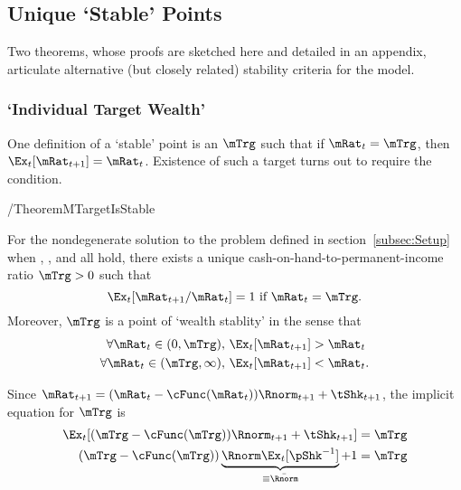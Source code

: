\documentclass[BufferStockTheory]{subfiles}
\providecommand{\LtxDir}{LaTeX/}
\begin{document}
\subsection{Unique `Stable' Points}

Two theorems, whose proofs are sketched here and detailed in an appendix, articulate alternative (but closely related) stability criteria for the model.

\label{subsec:onetarget}
\hypertarget{TheoremTarget}{}


\subsubsection{`Individual Target Wealth'} \label{subsubsec:mTarget}
One definition of a `stable' point is an $\mTrg$ such that if $\mRat_{t}=\mTrg$, then $\Ex_{t}[\mRat_{t+1}]=\mRat_{t}$.  Existence of such a target turns out to require the {\GICNrm} condition.

\begin{verbatimwrite}{\EqDir/TheoremMTargetIsStable}
\begin{theorem}\label{thm:target}
  For the nondegenerate solution to the problem defined in section~\ref{subsec:Setup} when {\FVAC}, {\WRIC}, and {\GICNrm} all hold, there exists a unique cash-on-hand-to-permanent-income ratio $\mTrg>0$ such that
  \begin{equation}  
    \Ex_t [{\mRat}_{t+1}/\mRat_t] = 1 \mbox{~if~} \mRat_t = \mTrg. 
    \label{eq:mTarget}
  \end{equation}
  Moreover, $\mTrg$ is a point of `wealth stablity' in the sense that
  \begin{align}\label{eq:stability}
    \forall {\mRat}_t\in(0,\mTrg),      \,\,& \Ex_t [{\mRat}_{t+1}] > {\mRat}_t  \\
    \forall {\mRat}_t\in(\mTrg,\infty), \,\,& \Ex_t [{\mRat}_{t+1}] < {\mRat}_t. \notag
  \end{align}
  \end{theorem}
\end{verbatimwrite}


 \hypertarget{mTargImplicit}{}
 
 Since $\mRat_{t+1}=(\mRat_{t}-\cFunc(\mRat_{t}))\Rnorm_{t+1}+\tShk_{t+1}$, the implicit equation for $\mTrg$ is
 \begin{align}
  \Ex_{t}[(\mTrg-\cFunc(\mTrg))\Rnorm_{t+1}+\tShk_{t+1}] & = \mTrg \label{eq:mTargImplicit}
\\   (\mTrg-\cFunc(\mTrg))\underbrace{\Rnorm\Ex_{t}[\pShk^{-1}]}_{\equiv \bar{\Rnorm}}+1 & = \mTrg
 \end{align}
 
\end{document}
